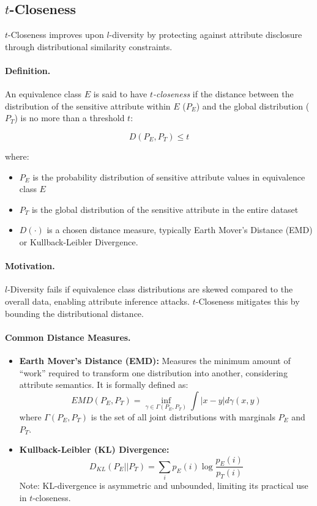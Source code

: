 \documentclass{article}
\begin{document}
\subsection{$t$-Closeness }

$t$-Closeness improves upon $l$-diversity by protecting against attribute disclosure through distributional similarity constraints.
\paragraph{ Definition.}
An equivalence class $E$ is said to have \textit{$t$-closeness} if the distance between the distribution of the sensitive attribute within $E$ ($P_E$) and the global distribution ($P_T$) is no more than a threshold $t$:

\[
D(P_E, P_T) \le t
\]

where:
\begin{itemize}
    \item $P_E$ is the probability distribution of sensitive attribute values in equivalence class $E$
    \item $P_T$ is the global distribution of the sensitive attribute in the entire dataset
    \item $D(\cdot)$ is a chosen distance measure, typically Earth Mover's Distance (EMD) or Kullback-Leibler Divergence.
\end{itemize}

\paragraph{Motivation.}
$l$-Diversity fails if equivalence class distributions are skewed compared to the overall data, enabling attribute inference attacks. $t$-Closeness mitigates this by bounding the distributional distance.

\paragraph{Common Distance Measures.}
\begin{itemize}
    \item \textbf{Earth Mover's Distance (EMD):} Measures the minimum amount of ``work'' required to transform one distribution into another, considering attribute semantics. It is formally defined as:
    \[
    EMD(P_E, P_T) = \inf_{\gamma \in \Gamma(P_E, P_T)} \int |x-y| d\gamma(x,y)
    \]
    where $\Gamma(P_E, P_T)$ is the set of all joint distributions with marginals $P_E$ and $P_T$.

    \item \textbf{Kullback-Leibler (KL) Divergence:}
    \[
    D_{KL}(P_E || P_T) = \sum_{i} p_E(i) \log \frac{p_E(i)}{p_T(i)}
    \]
    Note: KL-divergence is asymmetric and unbounded, limiting its practical use in $t$-closeness.

\end{itemize}
\end{document}
